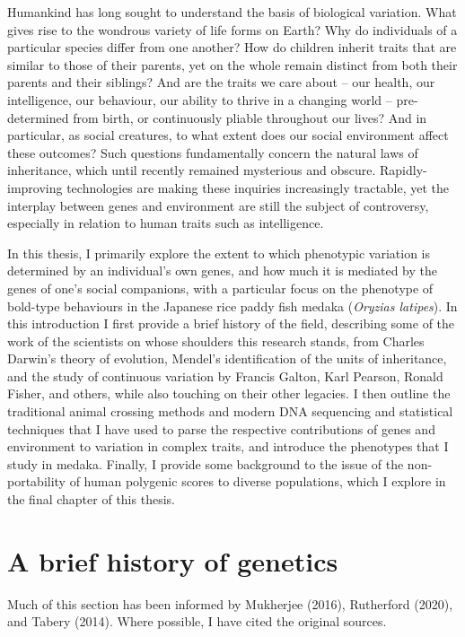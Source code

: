 \documentclass[
]{book}
\begin{document}
Humankind has long sought to understand the basis of biological variation. What gives rise to the wondrous variety of life forms on Earth? Why do individuals of a particular species differ from one another? How do children inherit traits that are similar to those of their parents, yet on the whole remain distinct from both their parents and their siblings? And are the traits we care about -- our health, our intelligence, our behaviour, our ability to thrive in a changing world -- pre-determined from birth, or continuously pliable throughout our lives? And in particular, as social creatures, to what extent does our social environment affect these outcomes? Such questions fundamentally concern the natural laws of inheritance, which until recently remained mysterious and obscure. Rapidly-improving technologies are making these inquiries increasingly tractable, yet the interplay between genes and environment are still the subject of controversy, especially in relation to human traits such as intelligence.

In this thesis, I primarily explore the extent to which phenotypic variation is determined by an individual's own genes, and how much it is mediated by the genes of one's social companions, with a particular focus on the phenotype of bold-type behaviours in the Japanese rice paddy fish medaka (\emph{Oryzias latipes}). In this introduction I first provide a brief history of the field, describing some of the work of the scientists on whose shoulders this research stands, from Charles Darwin's theory of evolution, Mendel's identification of the units of inheritance, and the study of continuous variation by Francis Galton, Karl Pearson, Ronald Fisher, and others, while also touching on their other legacies. I then outline the traditional animal crossing methods and modern DNA sequencing and statistical techniques that I have used to parse the respective contributions of genes and environment to variation in complex traits, and introduce the phenotypes that I study in medaka. Finally, I provide some background to the issue of the non-portability of human polygenic scores to diverse populations, which I explore in the final chapter of this thesis.

\hypertarget{a-brief-history-of-genetics}{%
\section{A brief history of genetics}\label{a-brief-history-of-genetics}}

Much of this section has been informed by Mukherjee (2016), Rutherford (2020), and Tabery (2014). Where possible, I have cited the original sources.
\end{document}

